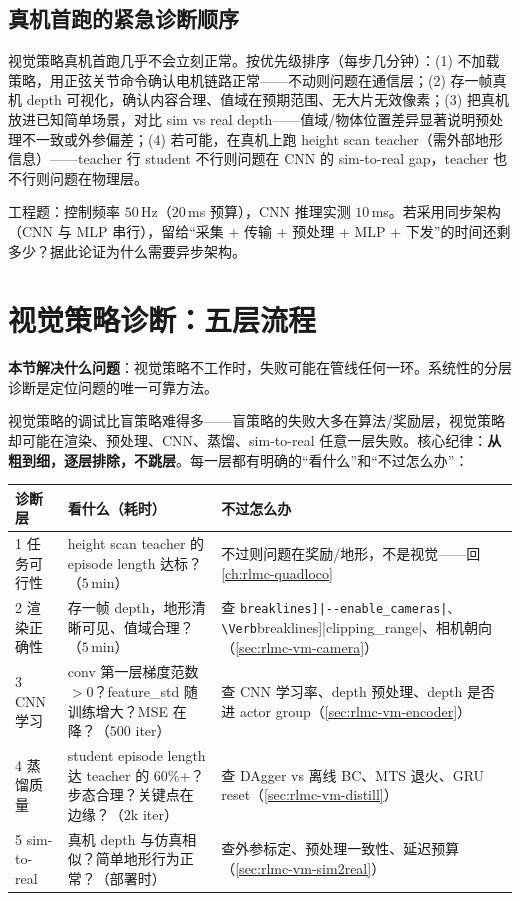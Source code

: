 \subsection{真机首跑的紧急诊断顺序}
\label{sec:rlmc-vm-firstrun}

视觉策略真机首跑几乎不会立刻正常。按优先级排序（每步几分钟）：(1) 不加载策略，用正弦关节命令确认电机链路正常——不动则问题在通信层；(2) 存一帧真机 depth 可视化，确认内容合理、值域在预期范围、无大片无效像素；(3) 把真机放进已知简单场景，对比 sim vs real depth——值域/物体位置差异显著说明预处理不一致或外参偏差；(4) 若可能，在真机上跑 height scan teacher（需外部地形信息）——teacher 行 student 不行则问题在 CNN 的 sim-to-real gap，teacher 也不行则问题在物理层。

\begin{practice}[延迟预算计算]
工程题：控制频率 $50$\,Hz（$20$\,ms 预算），CNN 推理实测 $10$\,ms。若采用同步架构（CNN 与 MLP 串行），留给“采集 + 传输 + 预处理 + MLP + 下发”的时间还剩多少？据此论证为什么需要异步架构。
\end{practice}

\section{视觉策略诊断：五层流程}
\label{sec:rlmc-vm-diag}

\textbf{本节解决什么问题}：视觉策略不工作时，失败可能在管线任何一环。系统性的分层诊断是定位问题的唯一可靠方法。

视觉策略的调试比盲策略难得多——盲策略的失败大多在算法/奖励层，视觉策略却可能在渲染、预处理、CNN、蒸馏、sim-to-real 任意一层失败。核心纪律：\textbf{从粗到细，逐层排除，不跳层}。每一层都有明确的“看什么”和“不过怎么办”：

\begin{center}
\small
\begin{tabular}{@{}p{2.2cm}p{4.2cm}p{5.0cm}@{}}
\toprule
诊断层 & 看什么（耗时） & 不过怎么办 \\
\midrule
1 任务可行性 & height scan teacher 的 episode length 达标？（$5$\,min） & 不过则问题在奖励/地形，不是视觉——回 \cref{ch:rlmc-quadloco} \\
2 渲染正确性 & 存一帧 depth，地形清晰可见、值域合理？（$5$\,min） & 查 \Verb[breaklines]|--enable_cameras|、\Verb[breaklines]|clipping_range|、相机朝向（\cref{sec:rlmc-vm-camera}） \\
3 CNN 学习 & conv 第一层梯度范数 $>0$？feature\_std 随训练增大？MSE 在降？（$500$ iter） & 查 CNN 学习率、depth 预处理、depth 是否进 actor group（\cref{sec:rlmc-vm-encoder}） \\
4 蒸馏质量 & student episode length 达 teacher 的 $60\%$+？步态合理？关键点在边缘？（$2$k iter） & 查 DAgger vs 离线 BC、MTS 退火、GRU reset（\cref{sec:rlmc-vm-distill}） \\
5 sim-to-real & 真机 depth 与仿真相似？简单地形行为正常？（部署时） & 查外参标定、预处理一致性、延迟预算（\cref{sec:rlmc-vm-sim2real}） \\
\bottomrule
\end{tabular}
\end{center}

